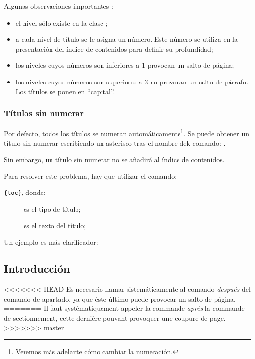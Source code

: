 Algunas observaciones importantes :
\begin{itemize}
\item el nivel  sólo existe en la clase ;
\item a cada nivel de título se le asigna un número. Este número se utiliza en la presentación del índice de contenidos para definir su profundidad;\label{numeroniveau}
\item los niveles cuyos números son inferiores a 1 provocan un salto de página;
\item los niveles cuyos números son superiores a 3 no provocan un salto de párrafo. Los títulos se ponen en  \enquote{capital}. %
\end{itemize}

\subsection{Títulos sin numerar}\label{titresansnumero}

Por defecto, todos los títulos se numeran automáticamente\footnote{Veremos más adelante cómo cambiar la numeración.}. Se puede obtener un título sin numerar escribiendo un asterisco tras el nombre dek comando: .


Sin embargo, un título sin numerar no se añadirá al índice de contenidos. 

Para resolver este problema, hay que utilizar el comando:

\verb|{toc}|, donde: \label{addcontentsline}

\begin{description}
    \item[] es el tipo de título;
    \item[] es el texto del título;
\end{description}

Un ejemplo es más clarificador:


\begin{latexcode}
\chapter*{Introducción}
\end{latexcode}

\begin{attention}
<<<<<<< HEAD
Es necesario llamar sistemáticamente al comando  \emph{después} del comando de apartado, ya que éste último puede provocar un salto de página.
=======
Il faut systématiquement appeler la commande  \emph{après} la commande de sectionnement, cette dernière pouvant provoquer une coupure de page.
>>>>>>> master
\end{attention}

